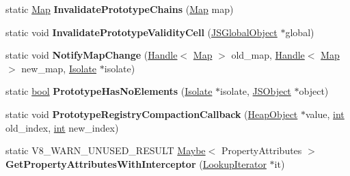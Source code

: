\begin{DoxyCompactItemize}
\item 
\mbox{\label{classv8_1_1internal_1_1JSObject_a4f15034be389b647c710a32cc5fc0278}} 
static \mbox{\hyperlink{classv8_1_1internal_1_1Map}{Map}} {\bfseries Invalidate\+Prototype\+Chains} (\mbox{\hyperlink{classv8_1_1internal_1_1Map}{Map}} map)
\item 
\mbox{\label{classv8_1_1internal_1_1JSObject_a4706388f822c89915dbba8e10f0304a6}} 
static void {\bfseries Invalidate\+Prototype\+Validity\+Cell} (\mbox{\hyperlink{classv8_1_1internal_1_1JSGlobalObject}{J\+S\+Global\+Object}} $\ast$global)
\item 
\mbox{\label{classv8_1_1internal_1_1JSObject_a9975b82083d56afea52ee20431d27805}} 
static void {\bfseries Notify\+Map\+Change} (\mbox{\hyperlink{classv8_1_1internal_1_1Handle}{Handle}}$<$ \mbox{\hyperlink{classv8_1_1internal_1_1Map}{Map}} $>$ old\+\_\+map, \mbox{\hyperlink{classv8_1_1internal_1_1Handle}{Handle}}$<$ \mbox{\hyperlink{classv8_1_1internal_1_1Map}{Map}} $>$ new\+\_\+map, \mbox{\hyperlink{classv8_1_1internal_1_1Isolate}{Isolate}} $\ast$isolate)
\item 
\mbox{\label{classv8_1_1internal_1_1JSObject_a6044c8524e73da74a49df715fd04620f}} 
static \mbox{\hyperlink{classbool}{bool}} {\bfseries Prototype\+Has\+No\+Elements} (\mbox{\hyperlink{classv8_1_1internal_1_1Isolate}{Isolate}} $\ast$isolate, \mbox{\hyperlink{classv8_1_1internal_1_1JSObject}{J\+S\+Object}} $\ast$object)
\item 
\mbox{\label{classv8_1_1internal_1_1JSObject_a028fee16567b1bd67627ebe79c22a590}} 
static void {\bfseries Prototype\+Registry\+Compaction\+Callback} (\mbox{\hyperlink{classv8_1_1internal_1_1HeapObject}{Heap\+Object}} $\ast$value, \mbox{\hyperlink{classint}{int}} old\+\_\+index, \mbox{\hyperlink{classint}{int}} new\+\_\+index)
\item 
\mbox{\label{classv8_1_1internal_1_1JSObject_a53154dc4cc9df72366098b216110ab3c}} 
static V8\+\_\+\+W\+A\+R\+N\+\_\+\+U\+N\+U\+S\+E\+D\+\_\+\+R\+E\+S\+U\+LT \mbox{\hyperlink{classv8_1_1Maybe}{Maybe}}$<$ Property\+Attributes $>$ {\bfseries Get\+Property\+Attributes\+With\+Interceptor} (\mbox{\hyperlink{classv8_1_1internal_1_1LookupIterator}{Lookup\+Iterator}} $\ast$it)

\end{DoxyCompactItemize}
